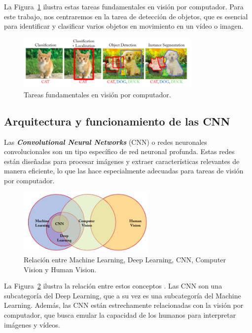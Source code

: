 \documentclass[11pt,spanish,listoffigures,listoftables]{tfgetsinf}
\begin{document}
La Figura~\ref{fig:tareas_vision_por_computador} ilustra estas tareas fundamentales en visión por computador. Para este trabajo, nos centraremos en la tarea de detección de objetos, que es esencial para identificar y clasificar varios objetos en movimiento en un vídeo o imagen. 

\begin{figure}[H]
   \centering
   \includegraphics[width=0.8\textwidth]{images/estado_del_arte/diferentes_formas_de_detectar.png}
   \caption{Tareas fundamentales en visión por computador.}
   \label{fig:tareas_vision_por_computador}
\end{figure}

\subsection{Arquitectura y funcionamiento de las CNN}
Las \textit{\textbf{Convolutional Neural Networks}} (CNN) o redes neuronales convolucionales son un tipo específico de red neuronal profunda. Estas redes están diseñadas para procesar imágenes y extraer características relevantes de manera eficiente, lo que las hace especialmente adecuadas para tareas de visión por computador.

\begin{figure}[H]
   \centering
   \includegraphics[width=0.6\textwidth]{images/estado_del_arte/diagrama_de_Venn_inteligencia_artificial.png}
   \caption{Relación entre Machine Learning, Deep Learning, CNN, Computer Vision y Human Vision.}
   \label{fig:diagrama_de_Venn_inteligencia_artificial}
\end{figure}

La Figura~\ref{fig:diagrama_de_Venn_inteligencia_artificial} ilustra la relación entre estos conceptos \cite{khan2018guide}. Las CNN son una subcategoría del Deep Learning, que a su vez es una subcategoría del Machine Learning. Además, las CNN están estrechamente relacionadas con la visión por computador, que busca emular la capacidad de los humanos para interpretar imágenes y vídeos.
\end{document}
